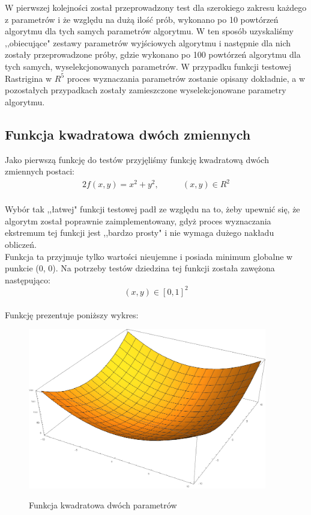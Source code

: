 \documentclass[twoside]{projektInzynierskiMS1}
\newcommand{\si}{ś}
\begin{document}
W pierwszej kolejno\si ci został przeprowadzony test dla szerokiego zakresu każdego z parametrów i że względu na dużą ilo\si ć prób, wykonano po 10 powtórzeń algorytmu dla tych samych parametrów algorytmu. W ten sposób uzyskali\si my ,,obiecujące" zestawy parametrów wyj\si ciowych algorytmu i następnie dla nich zostały przeprowadzone próby, gdzie wykonano po 100 powtórzeń algorytmu dla tych samych, wyselekcjonowanych parametrów. W przypadku funkcji testowej Rastrigina w $R^5$ proces wyznaczania parametrów zostanie opisany dokładnie, a w pozostałych przypadkach zostały zamieszczone wyselekcjonowane parametry algorytmu.



	\subsection{Funkcja kwadratowa dwóch zmiennych}
	Jako pierwszą funkcję do testów przyjęli\si my funkcję kwadratową dwóch zmiennych postaci:
\begin{alignat*}{2}
f(x, y) = x^2 + y^2,&\qquad  (x, y) \in R^2\\
\end{alignat*}

Wybór tak ,,łatwej" funkcji testowej padł ze względu na to, żeby upewnić się, że algorytm został poprawnie zaimplementowany, gdyż proces wyznaczania ekstremum tej funkcji jest ,,bardzo prosty" i nie wymaga dużego nakładu obliczeń. \\

Funkcja ta przyjmuje tylko warto\si ci nieujemne i posiada minimum globalne w punkcie (0, 0). Na potrzeby testów dziedzina tej funkcji została zawężona następująco:
\[(x, y)  \in [0,1]^2 \]\\ 


Funkcję prezentuje poniższy wykres:\\
\begin{figure}[H]
	\begin{center}
		\includegraphics[height=7cm]{pics/quadraticFunction1.png}\\
	\end{center}
	\caption{Funkcja kwadratowa dwóch parametrów}
\end{figure}
\end{document}
